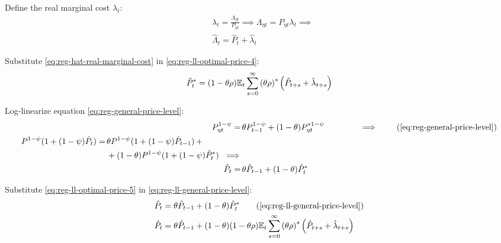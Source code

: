 \documentclass[
	thesis.tex
	]{subfiles}
\begin{document}
Define the real marginal cost $\lambda_t$:
\begin{align}
	& \lambda_t = \frac{\Lambda_{\eta t}}{P_{\eta t}} \implies \Lambda_{\eta t} = P_{\eta t} \lambda_t \implies \nonumber \\
	& \hat{\Lambda}_t = \hat{P}_t + \hat{\lambda}_t \label{eq:reg-hat-real-marginal-cost}
\end{align}

Substitute \ref{eq:reg-hat-real-marginal-cost} in \ref{eq:reg-ll-optimal-price-4}:
\begin{align}
	\hat{P}_t^\ast = (1- \theta \rho) {\mathbb{E}_{t}} \sum_{s=0}^{\infty} \left( \theta \rho \right)^s \left( \hat{P}_{t+s} + \hat{\lambda}_{t+s} \right) \label{eq:reg-ll-optimal-price-5}
\end{align}

Log-linearize equation \ref{eq:reg-general-price-level}:
\begin{align}
	P_{\eta t}^{1-\psi} =\, &\theta P_{t-1}^{1-\psi} + (1-\theta) P_{\eta t}^{\ast 1-\psi} \qquad \qquad \implies \tag{\ref{eq:reg-general-price-level}} \\
	\begin{split} P^{1-\psi} (1 + (1-\psi)\hat{P}_t) =\, &\theta P^{1-\psi} (1 + (1-\psi)\hat{P}_{t-1}) \, + \\ & + (1-\theta) P^{1-\psi} (1 + (1-\psi)\hat{P}_t^\ast) \ \implies \nonumber \end{split} \\
	\hat{P}_t =\, &\theta \hat{P}_{t-1} + (1-\theta) \hat{P}_t^\ast
	\label{eq:reg-ll-general-price-level}
\end{align}

Substitute \ref{eq:reg-ll-optimal-price-5} in \ref{eq:reg-ll-general-price-level}:
\begin{align}
	\hat{P}_t &= \theta \hat{P}_{t-1} + (1-\theta) \hat{P}_t^\ast \tag{\ref{eq:reg-ll-general-price-level}}\\
	\hat{P}_t &= \theta \hat{P}_{t-1} + (1-\theta) (1- \theta \rho) \E \sum_{s=0}^{\infty} \left( \theta \rho \right)^s \left( \hat{P}_{t+s} + \hat{\lambda}_{t+s} \right) \label{eq:reg-ll-general-price-level-2}
\end{align}
\end{document}
